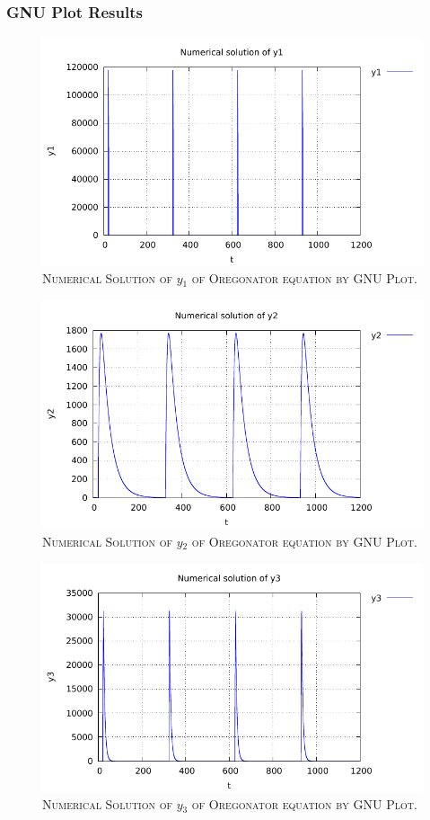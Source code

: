 \documentclass[a4paper,oneside]{book}
\numberwithin{equation}{chapter}
\begin{document}
\subsubsection{GNU Plot Results}
\begin{figure}[H]
\centering
\includegraphics[scale=1.1]{o_1}
\caption{\textsc{Numerical Solution of $y_1$ of  Oregonator equation by GNU Plot.}}
\end{figure}
\begin{figure}[H]
\centering
\includegraphics[scale=1.1]{o_2}
\caption{\textsc{Numerical Solution of $y_2$ of  Oregonator equation by GNU Plot.}}
\end{figure}
\begin{figure}[H]
\centering
\includegraphics[scale=1.1]{o_3}
\caption{\textsc{Numerical Solution of $y_3$ of  Oregonator equation by GNU Plot.}}
\end{figure}
\end{document}
